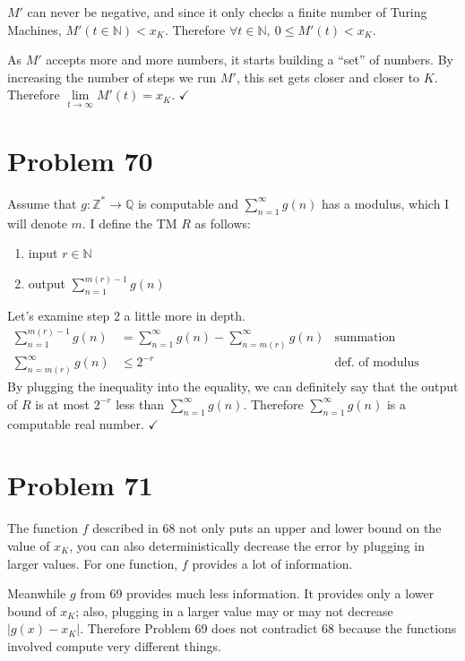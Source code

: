 \documentclass[11pt]{article}
\let\imp\rightarrow
\begin{document}
$M'$ can never be negative, and since it only checks a finite number of Turing Machines, $M'(t \in \mathbb{N}) < x_K$.
Therefore $\forall t \in \mathbb{N},\ 0 \leq M'(t) < x_K$.

As $M'$ accepts more and more numbers, it starts building a ``set'' of numbers.
By increasing the number of steps we run $M'$, this set gets closer and closer to $K$.
Therefore $\lim \limits _{t \imp \infty} M'(t) = x_K$. $\checkmark$


\section*{Problem 70}

Assume that $g: \mathbb{Z}^* \imp \mathbb{Q}$ is computable and $\sum _{n=1} ^\infty g(n)$ has a modulus, which I will denote $m$.
I define the TM $R$ as follows:
\begin{enumerate}
	\item input $r \in \mathbb{N}$
	\item output $\sum _{n= 1} ^{m(r) -1} g(n)$
\end{enumerate}

Let's examine step 2 a little more in depth.
\begin{align*}
	\sum \limits _{n=1} ^{m(r) -1} g(n) &= \sum \limits _{n=1} ^\infty g(n) - \sum \limits _{n=m(r)} ^\infty g(n) & \text{summation properties} \\
	\sum \limits _{n=m(r)} ^\infty g(n) &\leq 2^{-r} & \text{def. of modulus}
\end{align*}
By plugging the inequality into the equality, we can definitely say that the output of $R$ is at most $2^{-r}$ less than $\sum _{n=1} ^\infty g(n)$.
Therefore $\sum _{n=1} ^\infty g(n)$ is a computable real number. $\checkmark$

\section*{Problem 71}

The function $f$ described in 68 not only puts an upper and lower bound on the value of $x_K$, you can also deterministically decrease the error by plugging in larger values. For one function, $f$ provides a lot of information.

Meanwhile $g$ from 69 provides much less information. It provides only a lower bound of $x_K$; also, plugging in a larger value may or may not decrease $|g(x) - x_K|$.
Therefore Problem 69 does not contradict 68 because the functions involved compute very different things.
\end{document}
